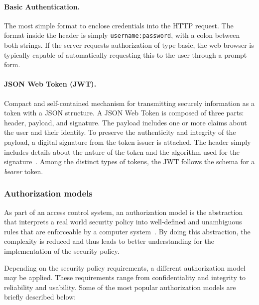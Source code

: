 \documentclass[12pt]{article}
\begin{document}
\paragraph{Basic Authentication.} The most simple format to enclose credentials into the HTTP request. The format inside the header is simply \texttt{username:password}, with a colon between both strings. If the server requests authorization of type basic, the web browser is typically capable of automatically requesting this to the user through a prompt form. 

\paragraph{JSON Web Token (JWT).} Compact and self-contained mechanism for transmitting securely information as a token with a JSON structure. A JSON Web Token is composed of three parts: header, payload, and signature. The payload includes one or more claims about the user and their identity. To preserve the authenticity and integrity of the payload, a digital signature from the token issuer is attached. The header simply includes details about the nature of the token and the algorithm used for the signature~\cite{RFC7519}. Among the distinct types of tokens, the JWT follows the schema for a \emph{bearer} token. 

\subsubsection{Authorization models}

As part of an access control system, an authorization model is the abstraction that interprets a real world security policy into well-defined and unambiguous rules that are enforceable by a computer system~\cite{access_01}. By doing this abstraction, the complexity is reduced and thus leads to better understanding for the implementation of the security policy. 

Depending on the security policy requirements, a different authorization model may be applied. These requirements range from confidentiality and integrity to reliability and usability. Some of the most popular authorization models are briefly described below:
\end{document}
